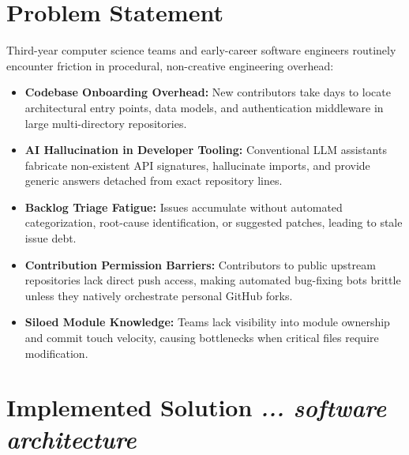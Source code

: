 \documentclass[11pt,a4paper]{article}
\begin{document}
\section{Problem Statement}
Third-year computer science teams and early-career software engineers routinely encounter friction in procedural, non-creative engineering overhead:
\begin{itemize}
    \item \textbf{Codebase Onboarding Overhead:} New contributors take days to locate architectural entry points, data models, and authentication middleware in large multi-directory repositories.
    \item \textbf{AI Hallucination in Developer Tooling:} Conventional LLM assistants fabricate non-existent API signatures, hallucinate imports, and provide generic answers detached from exact repository lines.
    \item \textbf{Backlog Triage Fatigue:} Issues accumulate without automated categorization, root-cause identification, or suggested patches, leading to stale issue debt.
    \item \textbf{Contribution Permission Barriers:} Contributors to public upstream repositories lack direct push access, making automated bug-fixing bots brittle unless they natively orchestrate personal GitHub forks.
    \item \textbf{Siloed Module Knowledge:} Teams lack visibility into module ownership and commit touch velocity, causing bottlenecks when critical files require modification.
\end{itemize}

\section{Implemented Solution \hfill \normalfont\small\textit{... software architecture}}
\end{document}
